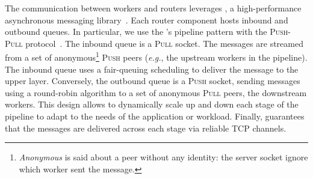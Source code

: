 The communication between workers and routers leverages \zmq, a high-performance asynchronous messaging library~\cite{zero_mq}.
Each router component hosts inbound and outbound queues. %
In particular, we use the \zmq's pipeline pattern with the \textsc{Push}-\textsc{Pull} protocol~\cite{zero_mq:pipeline}.
The inbound queue is a \textsc{Pull} socket.
The messages are streamed from a set of anonymous\footnote{\emph{Anonymous} is said about a peer without any identity: the server socket ignore which worker sent the message.} \textsc{Push} peers (\emph{e.g.}, the upstream workers in the pipeline).
The inbound queue uses a fair-queuing scheduling to deliver the message to the upper layer.
Conversely, the outbound queue is a \textsc{Push} socket, sending messages using a round-robin algorithm to a set of anonymous \textsc{Pull} peers, the downstream workers.
This design allows to dynamically scale up and down each stage of the pipeline to adapt to the needs of the application or workload. %
Finally, \zmq guarantees that the messages are delivered across each stage via reliable TCP channels.



